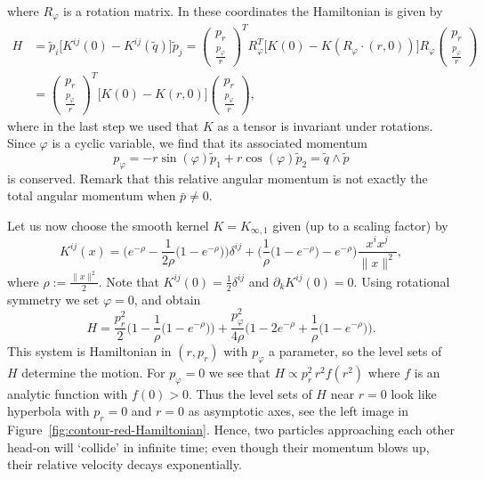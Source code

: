 \documentclass[12pt]{amsart}
\begin{document}
where $R_\varphi$ is a rotation matrix. In these coordinates the
Hamiltonian is given by
\begin{equation*}
  \begin{aligned}
  H &= \tilde{p}_i \big[ K^{ij}(0) - K^{ij}(\tilde{q}) \big] \tilde{p}_j
     = \begin{pmatrix} p_r \\ \frac{p_\varphi}{r} \end{pmatrix}^T R_\varphi^T
       \big[ K(0) - K(R_\varphi\cdot(r,0)) \big] R_\varphi
       \begin{pmatrix} p_r \\ \frac{p_\varphi}{r} \end{pmatrix}\\
    &= \begin{pmatrix} p_r \\ \frac{p_\varphi}{r} \end{pmatrix}^T
       \big[ K(0) - K(r,0) \big] \begin{pmatrix} p_r \\ \frac{p_\varphi}{r} \end{pmatrix},
  \end{aligned}
\end{equation*}
where in the last step we used that $K$ as a tensor is invariant under
rotations. Since $\varphi$ is a cyclic variable, we find that its
associated momentum
\begin{equation*}
  p_\varphi = -r \sin(\varphi) \tilde{p}_1 + r \cos(\varphi) \tilde{p}_2
            = \tilde{q} \wedge \tilde{p}
\end{equation*}
is conserved. Remark that this relative angular momentum is not
exactly the total angular momentum when $\bar{p} \neq 0$.

Let us now choose the smooth kernel $K = K_{\infty,1}$ given
(up to a scaling factor) by
%
{\newcommand{\e}{e^{-\rho}}
\begin{equation}\label{eq:smooth-kernel}
  K^{ij}(x) = \Big(\e - \frac{1}{2\rho}\big(1 - \e\big)\Big)\delta^{ij}
    + \Big(\frac{1}{\rho}\big(1 - \e\big) - \e\Big)\frac{x^i x^j}{\|x\|^2},
\end{equation}%
}%
where $\rho := \frac{\|x\|^2}{2}$. Note that
$K^{ij}(0) = \frac{1}{2} \delta^{ij}$ and $\partial_k K^{ij}(0) = 0$.
Using rotational symmetry we set $\varphi = 0$, and obtain
\begin{equation}\label{eq:H-rot-reduced}
  H = \frac{p_r^2      }{2}    \Big(1 - \frac{1}{\rho}\big(1-e^{-\rho}\big)\Big)
     +\frac{p_\varphi^2}{4\rho}\Big(1 - 2e^{-\rho} + \frac{1}{\rho}\big(1-e^{-\rho}\big)\Big).
\end{equation}
This system is Hamiltonian in $(r,p_r)$ with $p_\varphi$ a parameter, so
the level sets of $H$ determine the motion. For $p_\varphi = 0$ we see
that $H \propto p_r^2\, r^2 f(r^2)$ where $f$ is an analytic function
with $f(0) > 0$. Thus the level sets of $H$ near $r = 0$ look like
hyperbola with $p_r = 0$ and $r = 0$ as asymptotic axes, see the left image in
Figure~\eqref{fig:contour-red-Hamiltonian}. Hence, two particles approaching
each other head-on will `collide' in infinite time; even though their
momentum blows up, their relative velocity decays exponentially.
\end{document}
